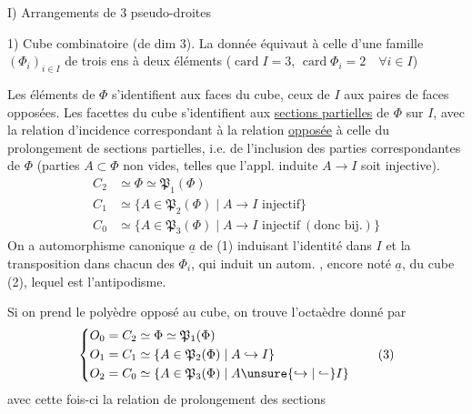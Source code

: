 I) Arrangements de $3$ pseudo-droites

1) Cube combinatoire (de dim 3). La donnée équivaut à celle d'une famille $(\Phi_i)_{i\in I}$ de trois ens à deux éléments ($\operatorname{card} I=3$, $\operatorname{card}\Phi_i=2\quad\forall i\in I$)

Les éléments de $\Phi$ s'identifient aux faces du cube, ceux de $I$ aux paires de faces opposées. Les facettes du cube s'identifient aux \uline{sections partielles} de $\Phi$ sur  $I$, avec la relation d'incidence correspondant à la relation \uline{opposée} à celle du prolongement de sections partielles, i.e. de l'inclusion des parties correspondantes de $\Phi$ (parties $A\subset\Phi$ non vides, telles que l'appl. induite $A\to I$ soit injective).
\[
\begin{aligned}
 C_2&\simeq\Phi\simeq\mathfrak P_1(\Phi)\\
 C_1&\simeq\{A\in\mathfrak P_2(\Phi)\mid A\to I\text{ injectif}\}\\
 C_0&\simeq\{A\in\mathfrak P_3(\Phi)\mid A\to I\text{ injectif}\ (\text{donc bij.})\}
\end{aligned}\tag*{(2)}
\]
On a  automorphisme  canonique $\underline a$ de (1) induisant l'identité dans $I$ et la transposition dans chacun des $\Phi_i$, qui induit un autom. , encore noté $\underline a$, du cube (2), lequel est l'antipodisme.

Si on prend le polyèdre opposé au cube, on trouve l'octaèdre donné par
\[
\left\{\begin{aligned}
 O_0&=C_2\simeq\Phi\simeq\mathfrak P_1(\Phi)\\
 O_1&=C_1\simeq\{A\in\mathfrak P_2(\Phi)\mid A\hookrightarrow I\}\\
 O_2&=C_0\simeq\{A\in\mathfrak P_3(\Phi)\mid A\unsure{\hookrightarrow|\lhook\joinrel\relbar} I\}
\end{aligned}\right.\tag*{(3)}
\]
avec cette fois-ci la relation  de prolongement des sections
